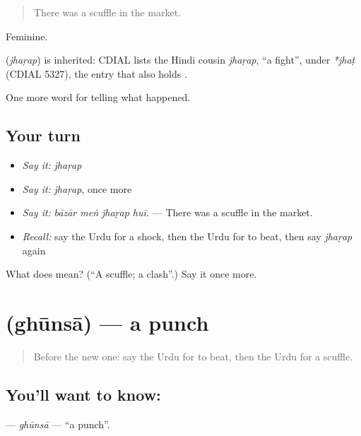 \begin{quote}
There was a scuffle in the market.
\end{quote}

Feminine.

\begin{cousinweb}
\textbf{} (\emph{jhaṛap}) is inherited: CDIAL lists the Hindi cousin \emph{jhaṛap}, \textquotedblleft{}a fight\textquotedblright{}, under \emph{*jhaṭ} (CDIAL 5327), the entry that also holds \textbf{}.
\end{cousinweb}

\begin{grammarlens}[title={What you've built}]
One more word for telling what happened.
\end{grammarlens}

\subsection*{Your turn}
\begin{itemize}
\raggedright
  \item \emph{Say it:} \emph{jhaṛap}
  \item \emph{Say it:} \emph{jhaṛap}, once more
  \item \emph{Say it:} \emph{bāzār meṅ jhaṛap huī.} — There was a scuffle in the market.
  \item \emph{Recall:} say the Urdu for a shock, then the Urdu for to beat, then say \emph{jhaṛap} again
\end{itemize}

\begin{tcolorbox}[breakable,colback=teal!4,colframe=teal!35!black,title={Before you move on}]
What does  mean? (\textquotedblleft{}A scuffle; a clash\textquotedblright{}.) Say it once more.
\end{tcolorbox}
\section[\texorpdfstring{\ur{گھونسا} (ghūnsā)}{گھونسا (ghūnsā)}]{ (ghūnsā) — a punch}

\label{lesson:UR-C307-ghunsa}



\begin{quote}
Before the new one: say the Urdu for to beat, then the Urdu for a scuffle.
\end{quote}

\subsection*{You'll want to know: }
\textbf{} — \emph{ghūnsā} — \textquotedblleft{}a punch\textquotedblright{}.

